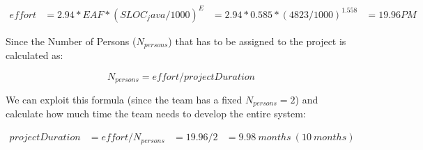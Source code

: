 \documentclass[../../../../projectPlan.tex]{subfiles}
\begin{document}
			\begin{align*}
				effort & = 2.94 * EAF * (SLOC_java/1000)^E
                       & = 2.94 * 0.585 * (4823/1000)^1.558
                       & = 19.96 PM
			\end{align*}

			Since the Number of Persons (\(N_{persons}\)) that has to be assigned to the project is calculated as:

			\[N_{persons} = effort / projectDuration \]

			We can exploit this formula (since the team has a fixed \(N_{persons} = 2\)) and calculate how much time the team needs to develop the entire system:

			\begin{align*}
				projectDuration & = effort / N_{persons}
				                & = 19.96 / 2
				                & = 9.98\ months\ (10\ months)
			\end{align*}
\end{document}
